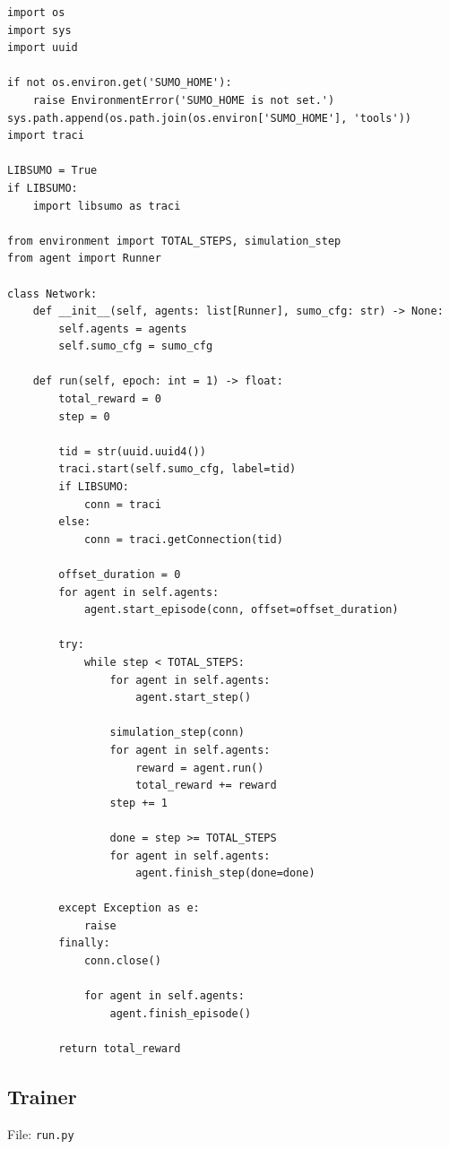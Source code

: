 \documentclass[a4paper]{report}
\begin{document}
\begin{lstlisting}[style=pythonstyle]
import os
import sys
import uuid

if not os.environ.get('SUMO_HOME'):
    raise EnvironmentError('SUMO_HOME is not set.')
sys.path.append(os.path.join(os.environ['SUMO_HOME'], 'tools'))
import traci

LIBSUMO = True
if LIBSUMO:
    import libsumo as traci

from environment import TOTAL_STEPS, simulation_step
from agent import Runner

class Network:
    def __init__(self, agents: list[Runner], sumo_cfg: str) -> None:
        self.agents = agents
        self.sumo_cfg = sumo_cfg

    def run(self, epoch: int = 1) -> float:
        total_reward = 0
        step = 0
        
        tid = str(uuid.uuid4())
        traci.start(self.sumo_cfg, label=tid)
        if LIBSUMO:
            conn = traci
        else:
            conn = traci.getConnection(tid)

        offset_duration = 0
        for agent in self.agents:
            agent.start_episode(conn, offset=offset_duration)

        try:
            while step < TOTAL_STEPS:
                for agent in self.agents:
                    agent.start_step()

                simulation_step(conn)
                for agent in self.agents:
                    reward = agent.run()
                    total_reward += reward
                step += 1

                done = step >= TOTAL_STEPS
                for agent in self.agents:
                    agent.finish_step(done=done)

        except Exception as e:
            raise
        finally:
            conn.close()

            for agent in self.agents:
                agent.finish_episode()

        return total_reward
\end{lstlisting}

\subsection{Trainer}

File: \texttt{run.py}
\end{document}
